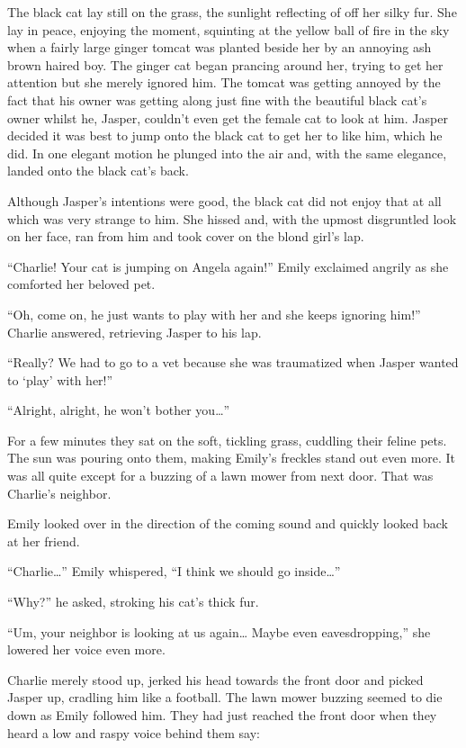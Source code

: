 The black cat lay still on the grass, the sunlight reflecting of off her silky fur. She lay in peace, enjoying the moment, squinting at the yellow ball of fire in the sky when a fairly large ginger tomcat was planted beside her by an annoying ash brown haired boy. The ginger cat began prancing around her, trying to get her attention but she merely ignored him. The tomcat was getting annoyed by the fact that his owner was getting along just fine with the beautiful black cat’s owner whilst he, Jasper, couldn’t even get the female cat to look at him. Jasper decided it was best to jump onto the black cat to get her to like him, which he did. In one elegant motion he plunged into the air and, with the same elegance, landed onto the black cat’s back.

Although Jasper’s intentions were good, the black cat did not enjoy that at all which was very strange to him. She hissed and, with the upmost disgruntled look on her face, ran from him and took cover on the blond girl’s lap.

“Charlie! Your cat is jumping on Angela again!” Emily exclaimed angrily as she comforted her beloved pet.

“Oh, come on, he just wants to play with her and she keeps ignoring him!” Charlie answered, retrieving Jasper to his lap.

“Really? We had to go to a vet because she was traumatized when Jasper wanted to ‘play’ with her!”

“Alright, alright, he won’t bother you…”

For a few minutes they sat on the soft, tickling grass, cuddling their feline pets. The sun was pouring onto them, making Emily’s freckles stand out even more. It was all quite except for a buzzing of a lawn mower from next door. That was Charlie’s neighbor.

Emily looked over in the direction of the coming sound and quickly looked back at her friend.

“Charlie…” Emily whispered, “I think we should go inside…”

“Why?” he asked, stroking his cat’s thick fur.

“Um, your neighbor is looking at us again… Maybe even eavesdropping,” she lowered her voice even more.

Charlie merely stood up, jerked his head towards the front door and picked Jasper up, cradling him like a football. The lawn mower buzzing seemed to die down as Emily followed him. They had just reached the front door when they heard a low and raspy voice behind them say:


